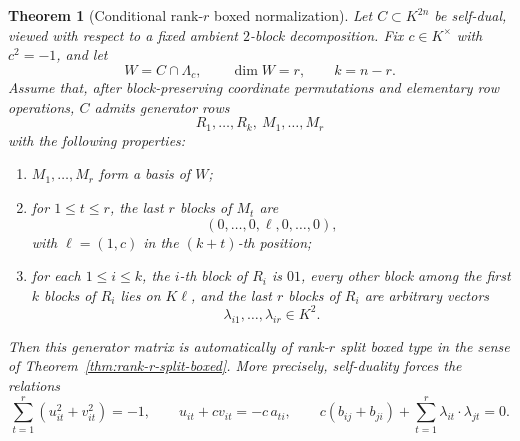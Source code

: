 \documentclass[12pt]{article}
\newtheorem{theorem}{Theorem}[section]
\begin{document}
\begin{theorem}[Conditional rank-\texorpdfstring{$r$}{r} boxed normalization]
\label{thm:conditional-rank-r-boxed-normalization}
Let \(C\subset K^{2n}\) be self-dual, viewed with respect to a fixed ambient \(2\)-block decomposition. Fix \(c\in K^\times\) with \(c^2=-1\), and let
\[
W=C\cap \Lambda_c,\qquad \dim W=r,\qquad k=n-r.
\]
Assume that, after block-preserving coordinate permutations and elementary row operations, \(C\) admits generator rows
\[
R_1,\dots,R_k,\ M_1,\dots,M_r
\]
with the following properties:
\begin{enumerate}
\item \(M_1,\dots,M_r\) form a basis of \(W\);
\item for \(1\le t\le r\), the last \(r\) blocks of \(M_t\) are
\[
(0,\dots,0,\ell,0,\dots,0),
\]
with \(\ell=(1,c)\) in the \((k+t)\)-th position;
\item for each \(1\le i\le k\), the \(i\)-th block of \(R_i\) is \(01\), every other block among the first \(k\) blocks of \(R_i\) lies on \(K\ell\), and the last \(r\) blocks of \(R_i\) are arbitrary vectors
\[
\lambda_{i1},\dots,\lambda_{ir}\in K^2.
\]
\end{enumerate}
Then this generator matrix is automatically of rank-\(r\) split boxed type in the sense of Theorem~\ref{thm:rank-r-split-boxed}. More precisely, self-duality forces the relations
\[
\sum_{t=1}^r (u_{it}^2+v_{it}^2)=-1,
\qquad
u_{it}+cv_{it}=-c\,a_{ti},
\qquad
c(b_{ij}+b_{ji})+\sum_{t=1}^r \lambda_{it}\cdot\lambda_{jt}=0.
\]
\end{theorem}
\end{document}
